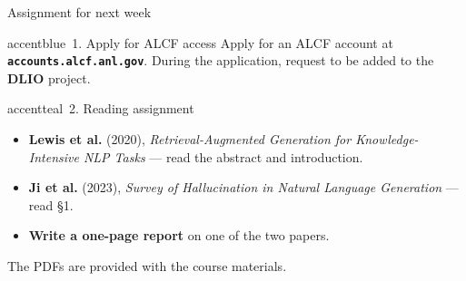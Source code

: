 \begin{frame}{Assignment for next week}
  \begin{featbox}{accentblue}{\faUserCircle\ 1. Apply for ALCF access}
    \small
    Apply for an ALCF account at
    \textbf{\texttt{accounts.alcf.anl.gov}}. During the application, request
    to be added to the \textbf{DLIO} project.
  \end{featbox}
  \vspace{7pt}
  \begin{featbox}{accentteal}{\faBookOpen\ 2. Reading assignment}
    \small
    \begin{itemize}
      \item \textbf{Lewis et al.} (2020), \emph{Retrieval-Augmented
        Generation for Knowledge-Intensive NLP Tasks} --- read the abstract
        and introduction.
      \item \textbf{Ji et al.} (2023), \emph{Survey of Hallucination in
        Natural Language Generation} --- read \S1.
      \item \textbf{Write a one-page report} on one of the two papers.
    \end{itemize}
  \end{featbox}
  \vspace{7pt}
  \begin{center}
    {\small\color{midgray}The PDFs are provided with the course materials.}
  \end{center}
\end{frame}


